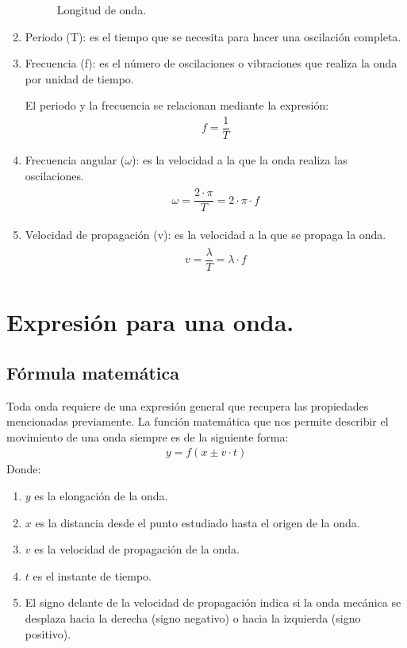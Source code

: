 \documentclass[12pt, letter]{article}
\begin{document}
\begin{enumerate}
\begin{figure}[H]
    \caption{Longitud de onda.}
\end{figure}
\item Periodo (T): es el tiempo que se necesita para hacer una oscilación completa.
\item Frecuencia (f): es el número de oscilaciones o vibraciones que realiza la onda por unidad de tiempo.

El periodo y la frecuencia se relacionan mediante la expresión:
\begin{align*}
f = \dfrac{1}{T}
\end{align*}
\item Frecuencia angular ($\omega$): es la velocidad a la que la onda realiza las oscilaciones.
\begin{eqnarray*}
\begin{aligned}
\omega = \dfrac{2 \cdot \pi}{T} =  2 \cdot \pi \cdot f
\end{aligned}
\end{eqnarray*}
\item Velocidad de propagación (v): es la velocidad a la que se propaga la onda.
\begin{eqnarray*}
\begin{aligned}
v = \dfrac{\lambda}{T} =  \lambda \cdot f
\end{aligned}
\end{eqnarray*}
\end{enumerate}


\section{Expresión para una onda.}

\subsection{Fórmula matemática}

Toda onda requiere de una expresión general que recupera las propiedades mencionadas previamente. La función matemática que nos permite describir el movimiento de una onda siempre es de la siguiente forma:
\begin{align*}
y = f (x \pm v \cdot t)
\end{align*}
Donde:
\begin{enumerate}
\item $y$ es la elongación de la onda.
\item $x$ es la distancia desde el punto estudiado hasta el origen de la onda.
\item $v$ es la velocidad de propagación de la onda.
\item $t$ es el instante de tiempo.
\item El signo delante de la velocidad de propagación indica si la onda mecánica se desplaza hacia la derecha (signo negativo) o hacia la izquierda (signo positivo).
\end{enumerate}
\end{document}
